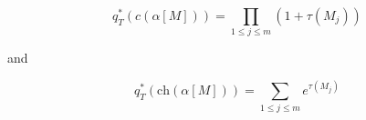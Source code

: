 $$q_T^*(c(\alpha[M])) = \prod_{1 \leq j \leq m} (1 + \tau(M_j))$$

and

$$q_T^*(\text{ch}(\alpha[M])) = \sum_{1 \leq j \leq m} e^{\tau(M_j)}$$
